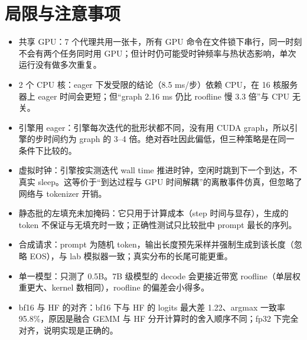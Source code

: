 \documentclass[11pt,a4paper]{ctexart}
\begin{document}
\section{局限与注意事项}\label{sec:caveat}
\begin{caveatbox}
\begin{itemize}
\item 共享 GPU：7 个代理共用一张卡，所有 GPU 命令在文件锁下串行，同一时刻不会有两个任务同时用 GPU；但计时仍可能受时钟频率与热状态影响，单次运行没有做多次重复。
\item 2 个 CPU 核：eager 下发受限的结论（8.5 ms/步）依赖 CPU，在 16 核服务器上 eager 时间会更短；但“graph 2.16 ms 仍比 roofline 慢 3.3 倍”与 CPU 无关。
\item 引擎用 eager：引擎每次迭代的批形状都不同，没有用 CUDA graph，所以引擎的步时间约为 graph 的 3--4 倍。绝对吞吐因此偏低，但三种策略是在同一条件下比较的。
\item 虚拟时钟：引擎按实测迭代 wall time 推进时钟，空闲时跳到下一个到达，不真实 sleep。这等价于“到达过程与 GPU 时间解耦”的离散事件仿真，但忽略了网络与 tokenizer 开销。
\item 静态批的左填充未加掩码：它只用于计算成本（step 时间与显存），生成的 token 不保证与无填充时一致；正确性测试只比较批中 prompt 最长的序列。
\item 合成请求：prompt 为随机 token，输出长度预先采样并强制生成到该长度（忽略 EOS），与 lab 模拟器一致；真实分布的长尾可能更重。
\item 单一模型：只测了 0.5B。7B 级模型的 decode 会更接近带宽 roofline（单层权重更大、kernel 数相同），roofline 的偏差会小得多。
\item bf16 与 HF 的对齐：bf16 下与 HF 的 logits 最大差 1.22、argmax 一致率 95.8\%，原因是融合 GEMM 与 HF 分开计算时的舍入顺序不同；fp32 下完全对齐，说明实现是正确的。
\end{itemize}
\end{caveatbox}

\end{document}
